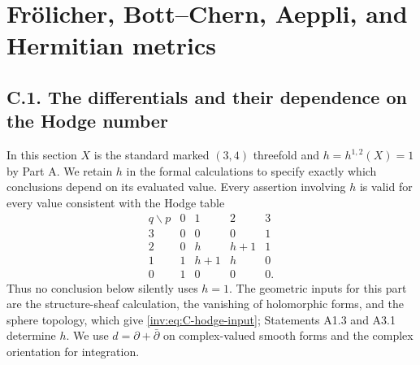 \section{Fr\"olicher, Bott--Chern, Aeppli, and Hermitian metrics}
\label{inv:sec:partC}

\subsection{C.1. The differentials and their dependence on the Hodge number}

In this section $X$ is the standard marked $(3,4)$ threefold and
$h=h^{1,2}(X)=1$ by Part A.  We retain $h$ in the formal calculations
to specify exactly which conclusions depend on its evaluated value.
Every assertion involving $h$ is valid for every value
consistent with the Hodge table
\begin{equation}\label{inv:eq:C-hodge-input}
\begin{array}{c|rrrr}
q\backslash p&0&1&2&3\\\hline
3&0&0&0&1\\
2&0&h&h+1&1\\
1&1&h+1&h&0\\
0&1&0&0&0.
\end{array}
\end{equation}
Thus no conclusion below silently uses $h=1$.  The geometric inputs for
this part are the structure-sheaf calculation, the vanishing of
holomorphic forms, and the sphere topology, which give
\eqref{inv:eq:C-hodge-input}; Statements A1.3 and A3.1 determine $h$.
We use $d=\partial+\bar\partial$ on complex-valued
smooth forms and the complex orientation for integration.

